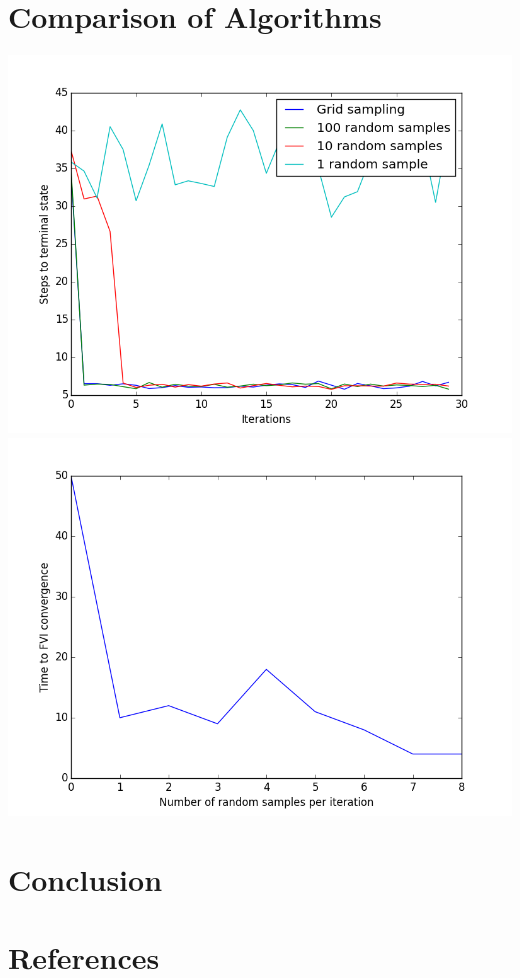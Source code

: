 \documentclass[a4paper, 12pt]{article}
\begin{document}
\section*{Comparison of Algorithms}
\includegraphics[scale=0.7]{convergence.png}
\includegraphics[scale=0.7]{n_samples.png}

\section*{Conclusion}

\section*{References}
%
%
\end{document}
